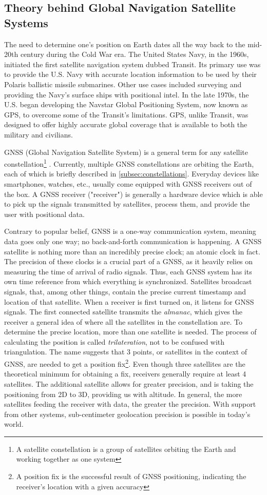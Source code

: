 \documentclass[FM,BP,EN,fonts]{tulthesis}
\begin{document}
\subsection{Theory behind Global Navigation Satellite Systems}
The need to determine one's position on Earth dates all the way back to the mid-20th century during the Cold War era. The United States Navy, in the 1960s, initiated the first satellite navigation system dubbed Transit. Its primary use was to provide the U.S. Navy with accurate location information to be used by their Polaris ballistic missile submarines. Other use cases included surveying and providing the Navy's surface ships with positional intel. In the late 1970s, the U.S. began developing the Navstar Global Positioning System, now known as GPS, to overcome some of the Transit's limitations. GPS, unlike Transit, was designed to offer highly accurate global coverage that is available to both the military and civilians.

GNSS (Global Navigation Satellite System) is a general term for any satellite constellation\footnote{A satellite constellation is a group of satellites orbiting the Earth and working together as one system} \cite{esa}. Currently, multiple GNSS constellations are orbiting the Earth, each of which is briefly described in \autoref{subsec:constellations}. Everyday devices like smartphones, watches, etc., usually come equipped with GNSS receivers out of the box. A GNSS receiver ("receiver") is generally a hardware device which is able to pick up the signals transmitted by satellites, process them, and provide the user with positional data. 

Contrary to popular belief, GNSS is a one-way communication system, meaning data goes only one way; no back-and-forth communication is happening. A GNSS satellite is nothing more than an incredibly precise clock; an atomic clock in fact. The precision of these clocks is a crucial part of a GNSS, as it heavily relies on measuring the time of arrival of radio signals. Thus, each GNSS system has its own time reference from which everything is synchronized. Satellites broadcast signals, that, among other things, contain the precise current timestamp and location of that satellite. When a receiver is first turned on, it listens for GNSS signals. The first connected satellite transmits the \textit{almanac}, which gives the receiver a general idea of where all the satellites in the constellation are. To determine the precise location, more than one satellite is needed. The process of calculating the position is called \textit{trilateration}, not to be confused with triangulation. The name suggests that 3 points, or satellites in the context of GNSS, are needed to get a position fix\footnote{A position fix is the successful result of GNSS positioning, indicating the receiver's location with a given accuracy}. Even though three satellites are the theoretical minimum for obtaining a fix, receivers generally require at least 4 satellites. The additional satellite allows for greater precision, and is taking the positioning from 2D to 3D, providing us with altitude. In general, the more satellites feeding the receiver with data, the greater the precision. With support from other systems, sub-centimeter geolocation precision is possible in today's world.
\end{document}
